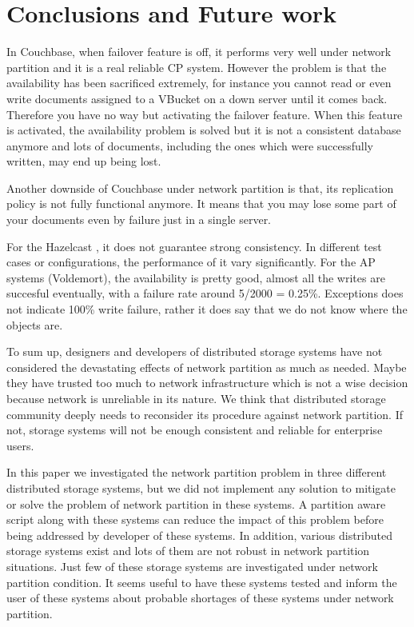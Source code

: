 \documentclass[a4paper]{article}
\begin{document}
\section{Conclusions and Future work}

In Couchbase, when failover feature is off, it performs very well under network partition and it is a real reliable CP system.
However the problem is that the availability has been sacrificed extremely, for instance you cannot read or even write documents assigned to a VBucket on a down server until it comes back.
Therefore you have no way but activating the failover feature. 
When this feature is activated, the availability problem is solved but it is not a consistent database anymore and lots of documents, including the ones which were successfully written, may end up being lost. 

Another downside of Couchbase under network partition is that, its replication policy is not fully functional anymore.
It means that you may lose some part of your documents even by failure just in a single server.

For the Hazelcast , it does not guarantee strong consistency. In different test cases or configurations, the performance of it
vary significantly.
For the AP systems (Voldemort), the availability is pretty good, almost all the writes are succesful eventually, with a failure rate around 5/2000 = 0.25\%.
Exceptions does not indicate 100\% write failure, rather it does say that we do not know where the objects are.

To sum up, designers and developers of distributed storage systems have not considered the devastating effects of network partition as much as needed.
Maybe they have trusted too much to network infrastructure which is not a wise decision because network is unreliable in its nature.
We think that distributed storage community deeply needs to reconsider its procedure against network partition.
If not, storage systems will not be enough consistent and reliable for enterprise users.

In this paper we investigated the network partition problem in three different distributed storage systems, but we did not implement any solution to mitigate or solve the problem of network partition in these systems. 
A partition aware script along with these systems can reduce the impact of this problem before being addressed by developer of these systems.
In addition, various distributed storage systems exist and lots of them are not robust in network partition situations.
Just few of these storage systems are investigated under network partition condition.
It seems useful to have these systems tested and inform the user of these systems about probable shortages of these systems under network partition.
\end{document}
